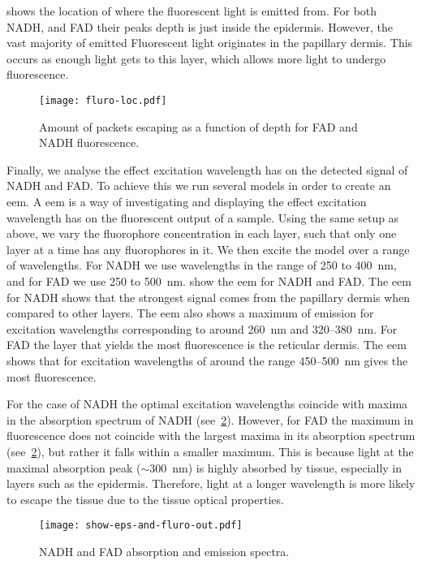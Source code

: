  shows the location of where the fluorescent light is emitted from.
For both NADH, and FAD their peaks depth is just inside the epidermis.
However, the vast majority of emitted Fluorescent light originates in the papillary dermis.
This occurs as enough light gets to this layer, which allows more light to undergo fluorescence. 


\begin{figure}[!htpb]
    \centering
    \texttt{[image: fluro-loc.pdf]}
    \caption{Amount of packets escaping as a function of depth for FAD and NADH fluorescence.}
    \label{fig:floc}
\end{figure}

Finally, we analyse the effect excitation wavelength has on the detected signal of NADH and FAD\@.
To achieve this we run several models in order to create an \gls*{eem}.
A \gls*{eem} is a way of investigating and displaying the effect excitation wavelength has on the fluorescent output of a sample.
Using the same setup as above, we vary the fluorophore concentration in each layer, such that only one layer at a time has any fluorophores in it.
We then excite the model over a range of wavelengths.
For NADH we use wavelengths in the range of 250 to 400~nm, and for FAD we use 250 to 500~nm.
 show the \gls*{eem} for NADH and FAD\@.
The \gls*{eem} for NADH shows that the strongest signal comes from the papillary dermis when compared to other layers.
The \gls*{eem} also shows a maximum of emission for excitation wavelengths corresponding to around 260~nm and 320--380~nm.
For FAD the layer that yields the most fluorescence is the reticular dermis.
The \gls*{eem} shows that for excitation wavelengths of around the range 450--500~nm gives the most fluorescence.

For the case of NADH the optimal excitation wavelengths coincide with maxima in the absorption spectrum of NADH (see~\cref{fig:epsfluro}).
However, for FAD the maximum in fluorescence does not coincide with the largest maxima in its absorption spectrum (see~\cref{fig:epsfluro}), but rather it falls within a smaller maximum.
This is because light at the maximal absorption peak ($\sim$300~nm) is highly absorbed by tissue, especially in layers such as the epidermis.
Therefore, light at a longer wavelength is more likely to escape the tissue due to the tissue optical properties.

\begin{figure}[!htpb]
    \centering
    \texttt{[image: show-eps-and-fluro-out.pdf]}
    \caption{NADH and FAD absorption and emission spectra.}
    \label{fig:epsfluro}
\end{figure}

